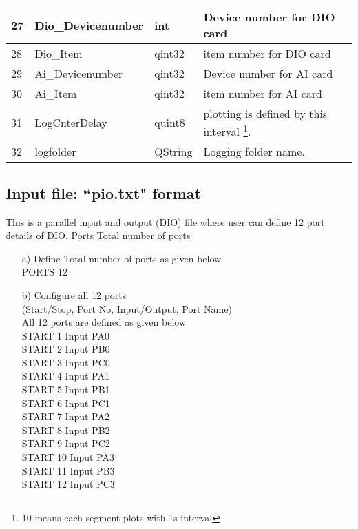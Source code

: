 \begin{table}[H]
{\begin{tabular}{|l|l|l|l|}
			27	& Dio\_Devicenumber & int & Device number for DIO card
			\\ \hline
			28 & Dio\_Item & qint32 & item number for DIO card
			\\ \hline
			29 & Ai\_Devicenumber & qint32 & Device number for AI card
			\\ \hline
			30 & Ai\_Item & qint32 & item number for AI card
			\\ \hline
			31 & LogCnterDelay & quint8 & plotting is defined by this interval \footnote{10 means each segment plots with 1s interval}.
			\\ \hline
			32            & logfolder                & QString     & Logging folder name.                 \\ \hline
	\end{tabular}}
\end{table}
\subsection{Input file: ``pio.txt" format}
\label{section:pio}
This is a parallel input and output (DIO) file where user can define 12 port details of DIO. 
Ports Total number of ports

\begin{enumerate}
	\item [a)] Define Total number of ports as given below\\
	PORTS 12
	\item [b)] Configure all 12 ports\\ (Start/Stop, Port No, Input/Output, Port Name)\\
	All 12 ports are defined as given below\\
	START 1 Input PA0\\
	START 2 Input PB0\\
	START 3 Input PC0\\
	START 4 Input PA1\\
	START 5 Input PB1\\
	START 6 Input PC1\\
	START 7 Input PA2\\
	START 8 Input PB2\\
	START 9 Input PC2\\
	START 10 Input PA3\\
	START 11 Input PB3\\
	START 12 Input PC3\\
\end{enumerate}

